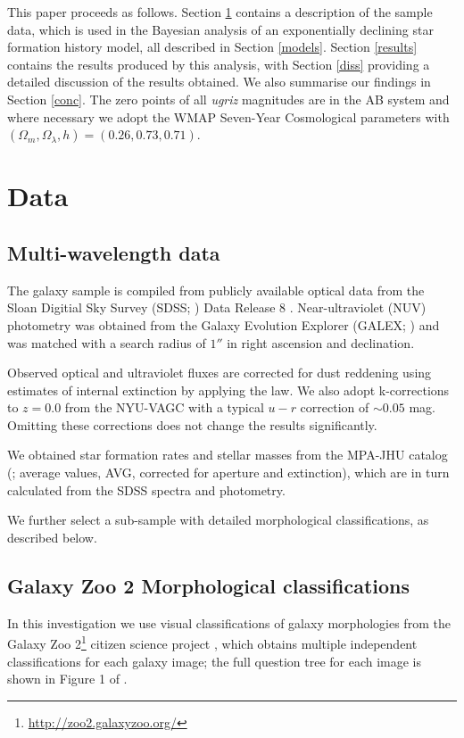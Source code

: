 \documentclass[useAMS,usenatbib]{mn2e}
\begin{document}
This paper proceeds as follows. Section \ref{data} contains a description of the sample data, which is used in the Bayesian analysis of an exponentially declining star formation history model, all described in Section \ref{models}. Section \ref{results} contains the results produced by this analysis, with Section \ref{diss} providing a detailed discussion of the results obtained. We also summarise our findings in Section \ref{conc}. The zero points of all \emph{ugriz} magnitudes are in the AB system and where necessary we adopt the WMAP Seven-Year Cosmological parameters \citep{WMAP} with $(\Omega_m, \Omega_{\lambda}, h) = (0.26, 0.73, 0.71)$. 

\section{Data}\label{data}
\subsection{Multi-wavelength data}\label{multi}
The galaxy sample is compiled from publicly available optical data from the Sloan Digitial Sky Survey (SDSS; \citealt{York00}) Data Release 8 \citep{Aihara11}. Near-ultraviolet (NUV) photometry was obtained from the Galaxy Evolution Explorer (GALEX; \citealt{Martin05}) and was matched with a search radius of $1''$ in right ascension and declination. 

Observed optical and ultraviolet fluxes are corrected for dust reddening using estimates of internal extinction \citep{Oh11} by applying the \citet*{Cardelli89} law. We also adopt k-corrections to $z=0.0$ from the NYU-VAGC \citep{Blanton05, Pad08, BR07} with a typical $u-r$ correction of $\sim 0.05$ mag. Omitting these corrections does not change the results significantly. 

We obtained star formation rates and stellar masses from the MPA-JHU catalog (\citealt{Kauff03, Brinch04}; average values, \textsc{AVG}, corrected for aperture and extinction), which are in turn calculated from the SDSS spectra and photometry. 

We further select a sub-sample with detailed morphological classifications, as described below.

\subsection{Galaxy Zoo 2 Morphological classifications}\label{class}


In this investigation we use visual classifications of galaxy morphologies from the Galaxy Zoo 2\footnote{\url{http://zoo2.galaxyzoo.org/}} citizen science project \citep{GZ2}, which obtains multiple independent classifications for each galaxy image; the full question tree for each image is shown in Figure 1 of \citealt{GZ2}.  
\end{document}
